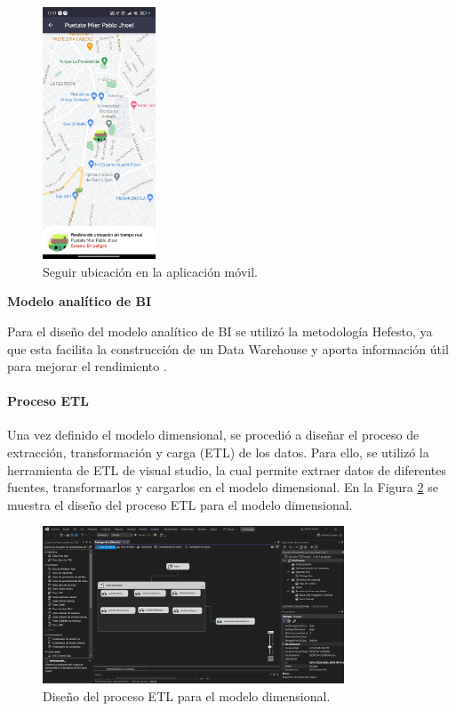 \begin{figure}[H]
    \centering
    \includegraphics[width=0.3\textwidth]{chapters/III-resultados-y-discusion/resources/images/seguir-ubicacion-movil.png}
    \caption{Seguir ubicación en la aplicación móvil.}
    \label{fig:seguir-ubicacion-movil}
\end{figure}

\textbf{Modelo analítico de BI}
\bigbreak

Para el diseño del modelo analítico de BI se utilizó la metodología Hefesto, ya que esta facilita la construcción de un
Data Warehouse y aporta información útil para mejorar el rendimiento \cite{darioDATAWAREHOUSINGMarco}.



\paragraph{Proceso ETL}

Una vez definido el modelo dimensional, se procedió a diseñar el proceso de extracción, transformación y carga (ETL) de los datos.
Para ello, se utilizó la herramienta de ETL de visual studio, la cual permite extraer datos de diferentes fuentes, transformarlos
y cargarlos en el modelo dimensional. En la Figura \ref{fig:etl-bi} se muestra el diseño del proceso ETL para el modelo dimensional.

\begin{figure}[H]
    \centering
    \includegraphics[width=0.8\textwidth]{chapters/III-resultados-y-discusion/resources/images/etl-bi.png}
    \caption{Diseño del proceso ETL para el modelo dimensional.}
    \label{fig:etl-bi}
\end{figure}

